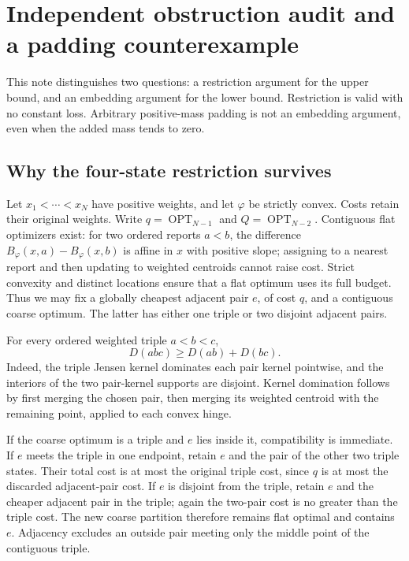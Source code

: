 \section{Independent obstruction audit and a padding counterexample}
\label{sec:p10-adversarial}

This note distinguishes two questions: a restriction argument for the upper
bound, and an embedding argument for the lower bound.  Restriction is valid
with no constant loss.  Arbitrary positive-mass padding is not an embedding
argument, even when the added mass tends to zero.

\subsection{Why the four-state restriction survives}
Let $x_1<\cdots<x_N$ have positive weights, and let $\varphi$ be strictly
convex.  Costs retain their original weights.  Write $q=\operatorname{OPT}_{N-1}$
and $Q=\operatorname{OPT}_{N-2}$.  Contiguous flat optimizers exist: for two
ordered reports $a<b$, the difference
$B_\varphi(x,a)-B_\varphi(x,b)$ is affine in $x$ with positive slope;
assigning to a nearest report and then updating to weighted centroids
cannot raise cost.  Strict convexity and distinct locations ensure that a
flat optimum uses its full budget.  Thus we may fix a globally cheapest
adjacent pair $e$, of cost $q$, and a contiguous coarse optimum.  The latter
has either one triple or two disjoint adjacent pairs.

For every ordered weighted triple $a<b<c$,
\[
 D(abc)\ge D(ab)+D(bc).
\]
Indeed, the triple Jensen kernel dominates each pair kernel pointwise,
and the interiors of the two pair-kernel supports are disjoint.  Kernel
domination follows by first merging the chosen pair, then merging its
weighted centroid with the remaining point, applied to each convex hinge.

If the coarse optimum is a triple and $e$ lies inside it, compatibility is
immediate.  If $e$ meets the triple in one endpoint, retain $e$ and the pair
of the other two triple states.  Their total cost is at most the original
triple cost, since $q$ is at most the discarded adjacent-pair cost.  If $e$
is disjoint from the triple, retain $e$ and the cheaper adjacent pair in the
triple; again the two-pair cost is no greater than the triple cost.  The
new coarse partition therefore remains flat optimal and contains $e$.
Adjacency excludes an outside pair meeting only the middle point of the
contiguous triple.

